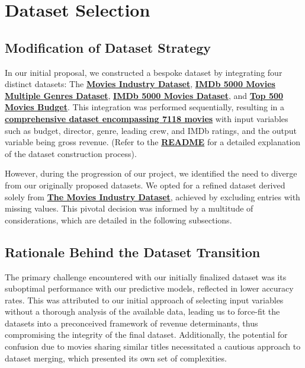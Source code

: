 \documentclass[conference]{IEEEtran}
\begin{document}
\section{Dataset Selection}
     \subsection{Modification of Dataset Strategy}
        In our initial proposal, we constructed a bespoke dataset by integrating four distinct datasets: The \href{https://www.kaggle.com/datasets/danielgrijalvas/movies}{\textbf{Movies Industry Dataset}}, \href{https://www.kaggle.com/datasets/rakkesharv/imdb-5000-movies-multiple-genres-dataset}{\textbf{IMDb 5000 Movies Multiple Genres Dataset}}, \href{https://www.kaggle.com/datasets/carolzhangdc/imdb-5000-movie-dataset}{\textbf{IMDb 5000 Movies Dataset}}, and \href{https://www.kaggle.com/datasets/mitchellharrison/top-500-movies-budget}{\textbf{Top 500 Movies Budget}}. This integration was performed sequentially, resulting in a \href{../../../../data/processed/output.csv}{\textbf{comprehensive dataset encompassing 7118 movies}} with input variables such as budget, director, genre, leading crew, and IMDb ratings, and the output variable being gross revenue. (Refer to the \href{../../../../data/README.md}{\textbf{README}} for a detailed explanation of the dataset construction process).

        However, during the progression of our project, we identified the need to diverge from our originally proposed datasets. We opted for a refined dataset derived solely from \href{https://www.kaggle.com/datasets/danielgrijalvas/movies}{\textbf{The Movies Industry Dataset}}, achieved by excluding entries with missing values. This pivotal decision was informed by a multitude of considerations, which are detailed in the following subsections.

    \subsection{Rationale Behind the Dataset Transition}
        The primary challenge encountered with our initially finalized dataset was its suboptimal performance with our predictive models, reflected in lower accuracy rates. This was attributed to our initial approach of selecting input variables without a thorough analysis of the available data, leading us to force-fit the datasets into a preconceived framework of revenue determinants, thus compromising the integrity of the final dataset. Additionally, the potential for confusion due to movies sharing similar titles necessitated a cautious approach to dataset merging, which presented its own set of complexities.
\end{document}
